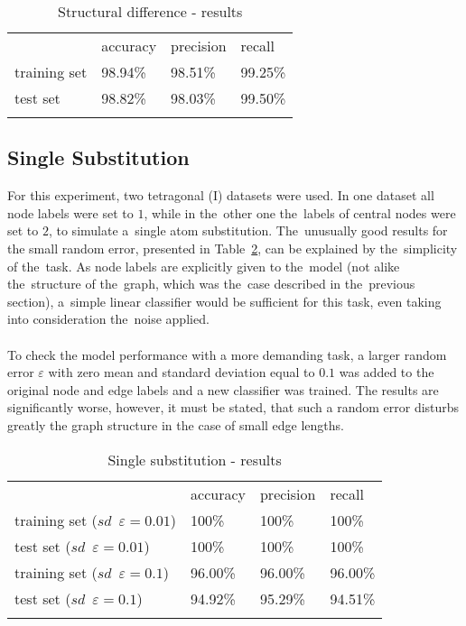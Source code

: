 \documentclass{llncs}
\begin{document}
\begin{table}[h!]
\begin{center}
\caption{Structural difference - results}
\begin{tabular}{llll}
\hline\noalign{\smallskip}
 & accuracy & precision & recall\\
\noalign{\smallskip}
\hline
\noalign{\smallskip}
training set & 98.94\% &  98.51\% & 99.25\% \\
test set & 98.82\% & 98.03\% &  99.50\% \\
\hline
\label{tab:struct}
\end{tabular}
\end{center}
\end{table}


\subsection{Single Substitution}
For this experiment, two tetragonal (I) datasets were used. In one dataset all node labels were set to $1$, while in the~other one the~labels of central nodes were set to $2$, to simulate a~single atom substitution. The~unusually good results for the small random error, presented in Table~\ref{tab:subst}, can be explained by the~simplicity of the~task. As node labels are explicitly given to the~model (not alike the~structure of the~graph, which was the~case described in the~previous section), a~simple linear classifier would be sufficient for this task, even taking into consideration the~noise applied.
\\\\
To check the model performance with a more demanding task, a larger random error $\varepsilon$ with zero mean and standard deviation equal to $0.1$ was added to the original node and edge labels and a new classifier was trained. The results are significantly worse, however, it must be stated, that such a random error disturbs greatly the graph structure in the case of small edge lengths.

\begin{table}[h!]
\begin{center}
\caption{Single substitution - results}
\begin{tabular}{llll}
\hline\noalign{\smallskip}
 & accuracy & precision & recall\\
\noalign{\smallskip}
\hline
\noalign{\smallskip}
training set ($sd \enspace \varepsilon = 0.01$) & 100\% &  100\% & 100\% \\
test set ($sd \enspace \varepsilon = 0.01$) & 100\% & 100\% & 100\% \\
training set ($sd \enspace \varepsilon = 0.1$) & 96.00\% &  96.00\% & 96.00\% \\
test set ($sd \enspace \varepsilon = 0.1$) & 94.92\% & 95.29\% & 94.51\% \\
\hline
\label{tab:subst}
\end{tabular}
\end{center}
\end{table}
\end{document}
